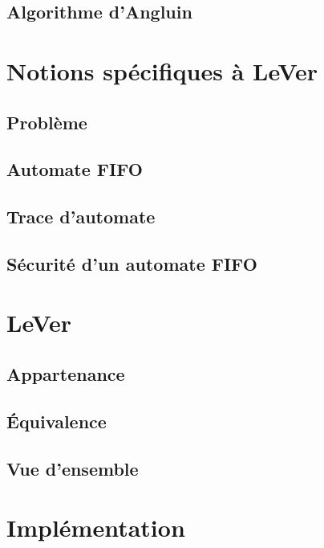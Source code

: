 	\section{Algorithme d'Angluin}\label{sec:angluin}

	\chapter{Notions spécifiques à LeVer}\label{ch:specific}
	\section{Problème}\label{sec:prob}%
	\section{Automate FIFO}\label{sec:fifo}
	\section{Trace d'automate}\label{sec:trace}%
	\section{Sécurité d'un automate FIFO}\label{sec:unsafe}%

	\chapter{LeVer}\label{ch:lever}
	\section{Appartenance}\label{sec:membership}
	\section{Équivalence}\label{sec:equivalence}
	\section{Vue d'ensemble}\label{sec:global}



	\chapter{Implémentation}\label{ch:impl}
